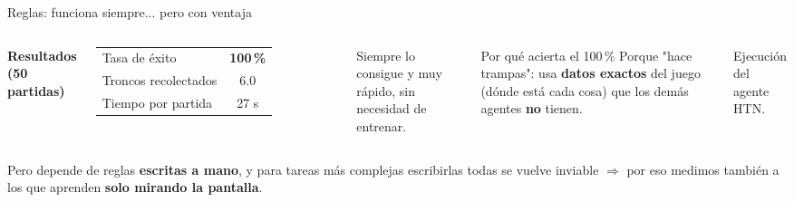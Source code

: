 \documentclass[aspectratio=169,10pt]{beamer}
\newcommand{\hl}[1]{\textcolor{UDCmag}{\textbf{#1}}}
\begin{document}
\begin{frame}{Reglas: funciona siempre... pero con ventaja}
  \begin{columns}[T]
      \textbf{Resultados (50 partidas)}
      \vspace{0.3em}
      \begin{table}\centering\small
        \begin{tabular}{@{}lc@{}}
          \toprule
          Tasa de éxito & \hl{100\,\%}\\
          Troncos recolectados & 6.0\\
          Tiempo por partida & 27 s\\
          \bottomrule
        \end{tabular}
      \end{table}
      \vspace{0.4em}
      \footnotesize Siempre lo consigue y muy rápido, sin necesidad de entrenar.

      \vspace{0.6em}
      \begin{alertblock}{Por qué acierta el 100\,\%}
        \footnotesize Porque "hace trampas": usa \hl{datos exactos} del juego (dónde está
        cada cosa) que los demás agentes \hl{no} tienen.
      \end{alertblock}

      \centering
      \vspace{0.3em}
      {\scriptsize Ejecución del agente HTN.}
  \end{columns}

  \vspace{0.5em}
  \footnotesize
  Pero depende de reglas \hl{escritas a mano}, y para tareas más complejas escribirlas todas
  \alert{se vuelve inviable} $\Rightarrow$ por eso medimos también a los que aprenden
  \hl{solo mirando la pantalla}.
\end{frame}

\end{document}
